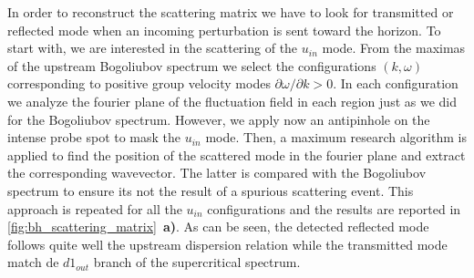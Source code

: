 In order to reconstruct the scattering matrix we have to look for transmitted or reflected mode when an incoming perturbation is sent toward the horizon. To start with, we are interested in the scattering of the $u_{in}$ mode.
From the maximas of the upstream Bogoliubov spectrum we select the configurations $(k,\omega)$ corresponding to positive group velocity modes $\partial\omega/\partial k>0$. 
In each configuration we analyze the fourier plane of the fluctuation field in each region just as we did for the Bogoliubov spectrum. 
However, we apply now an antipinhole on the intense probe spot to mask the $u_{in}$ mode. Then, a maximum research algorithm is applied to find the position of the scattered mode in the fourier plane and extract the corresponding wavevector.
The latter is compared with the Bogoliubov spectrum to ensure its not the result of a spurious scattering event. This approach is repeated for 
all the $u_{in}$ configurations and the results are reported in \autoref{fig:bh_scattering_matrix}~\textbf{a)}. As can be seen, the detected reflected mode follows quite well the upstream dispersion relation while the transmitted mode
match de $d1_{out}$ branch of the supercritical spectrum.
